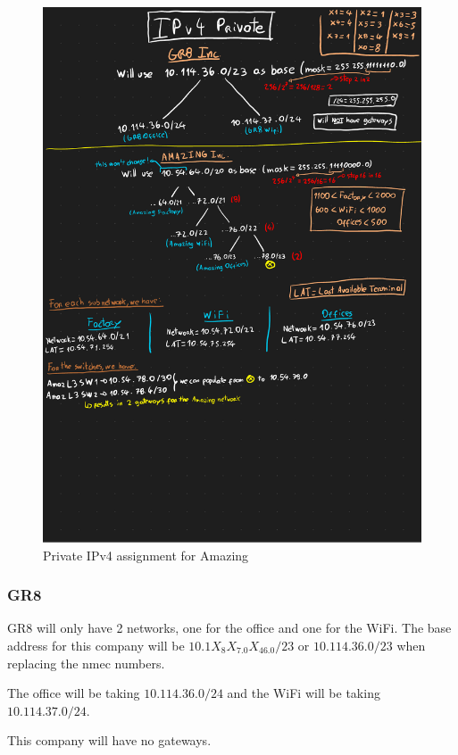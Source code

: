 \documentclass{report}
\begin{document}
\begin{figure}[H]
    \centering
    \includegraphics[width=\textwidth,trim={0 7cm 0 7.9cm},clip]{private-ipv4}
    \caption{Private IPv4 assignment for Amazing}
    \label{fig:private-ipv4-amazing}
\end{figure}

\subsubsection*{GR8}
GR8 will only have 2 networks, one for the office and one for the WiFi. The base address for this company will be $10.1X_8X_7.0X_46.0/23$ or $10.114.36.0/23$ when replacing the nmec numbers.

The office will be taking $10.114.36.0/24$ and the WiFi will be taking $10.114.37.0/24$.

This company will have no gateways.
\end{document}
